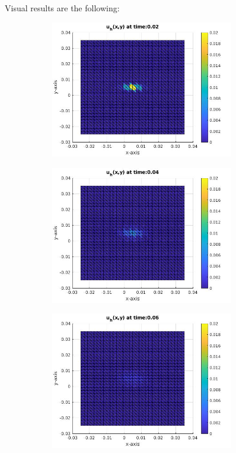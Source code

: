 \documentclass[a4paper,11pt]{article}
\begin{document}
\noindent Visual results are the following:
\newpage
{} 
\begin{figure}[h] \captionsetup{size = large} \caption{Test-case 1, activation missed ($I=500 \cdot 10^3$)}
	\centering
	\begin{subfigure}{0.4\textwidth}
		\includegraphics[width = 8cm]{./tc1-1/002.jpg}
	\end{subfigure}
	\begin{subfigure}{0.4\textwidth}
		\includegraphics[width =8cm]{./tc1-1/004.jpg}
	\end{subfigure}
	\begin{subfigure}{0.4\textwidth}
		\includegraphics[width = 8cm]{./tc1-1/006.jpg}
	\end{subfigure}
	\begin{subfigure}{0.4\textwidth}

\end{subfigure}
\end{figure}
\end{document}

